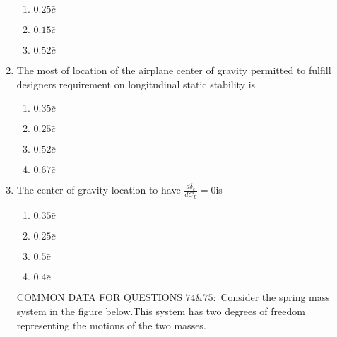 \documentclass[journal]{IEEEtran}
\begin{document}
\begin{enumerate}
\begin{enumerate}
        \item $0.25\bar{c}$
        \item $0.15\bar{c}$
        \item $0.52\bar{c}$
    \end{enumerate}
    \item The most of  location of the airplane center of gravity permitted to fulfill designers requirement on longitudinal static stability is
    \begin{enumerate}
         \item $0.35\bar{c}$
        \item $0.25\bar{c}$
        \item $0.52\bar{c}$
        \item $0.67\bar{c}$
    \end{enumerate}
    \item The center of gravity location to have $\frac{d\delta_e}{dC_L}=0$is
    \begin{enumerate}
        \item $0.35\bar{c}$
        \item $0.25\bar{c}$
        \item $0.5\bar{c}$
        \item $0.4\bar{c}$
    \end{enumerate}
     COMMON DATA FOR QUESTIONS $74\&75:$ Consider the spring mass system in the figure below.This system has two degrees of freedom representing the motions of the two masses.

\end{enumerate}
\end{document}
